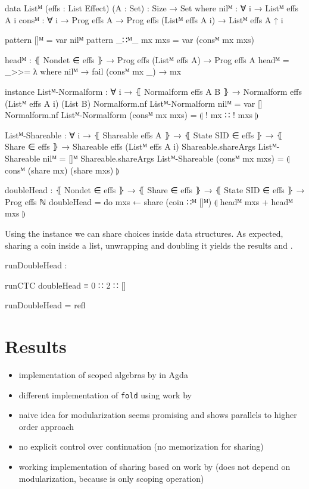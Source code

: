 \begin{code}[hide]
data Listᴹ (effs : List Effect) (A : Set) : {Size} → Set where
  nilᴹ  : ∀ {i} → Listᴹ effs A {i}
  consᴹ : ∀ {i} → Prog effs A → Prog effs (Listᴹ effs A {i}) → Listᴹ effs A {↑ i}

pattern []ᴹ         = var nilᴹ
pattern _∷ᴹ_ mx mxs = var (consᴹ mx mxs)

headᴹ : ⦃ Nondet ∈ effs ⦄ → Prog effs (Listᴹ effs A) → Prog effs A
headᴹ = _>>= λ where
  nilᴹ         → fail
  (consᴹ mx _) → mx

instance
  Listᴹ-Normalform : ∀ {i} → ⦃ Normalform effs A B ⦄ → Normalform effs (Listᴹ effs A {i}) (List B)
  Normalform.nf Listᴹ-Normalform nilᴹ           = var []
  Normalform.nf Listᴹ-Normalform (consᴹ mx mxs) = ⦇ ! mx ∷ ! mxs ⦈

  Listᴹ-Shareable : ∀ {i} → ⦃ Shareable effs A ⦄ → ⦃ State SID ∈ effs ⦄ → ⦃ Share ∈ effs ⦄ → Shareable effs (Listᴹ effs A {i})
  Shareable.shareArgs Listᴹ-Shareable nilᴹ           = []ᴹ
  Shareable.shareArgs Listᴹ-Shareable (consᴹ mx mxs) = ⦇ consᴹ (share mx) (share mxs) ⦈
\end{code}
\begin{code}
doubleHead : ⦃ Nondet ∈ effs ⦄ → ⦃ Share ∈ effs ⦄ → ⦃ State SID ∈ effs ⦄ →
  Prog effs ℕ
doubleHead = do mxs ← share (coin ∷ᴹ []ᴹ)
                ⦇ headᴹ mxs + headᴹ mxs ⦈
\end{code}
Using the  instance we can share choices inside data
structures.
As expected, sharing a coin inside a list, unwrapping and doubling it yields the
results  and .

\begin{center}
\begin{code}
runDoubleHead :
\end{code}
\begin{code}[inline]
 runCTC doubleHead ≡ 0 ∷ 2 ∷ []
\end{code}
\begin{code}
runDoubleHead = refl
\end{code}
\end{center}


\section{Results}


\begin{itemize}
  \item implementation of scoped algebras by
    \textcite{DBLP:conf/lics/PirogSWJ18} in Agda
  \item different implementation of \texttt{fold} using work by
    \textcite{DBLP:journals/corr/abs-1806-05230}
  \item naive idea for modularization seems promising and shows parallels to
    higher order approach
  \item no explicit control over continuation (no memorization for sharing)
  \item working implementation of sharing based on work by
    \textcite{bunkenburg2019modeling} (does not depend on modularization,
    because  is only scoping operation)
\end{itemize}

